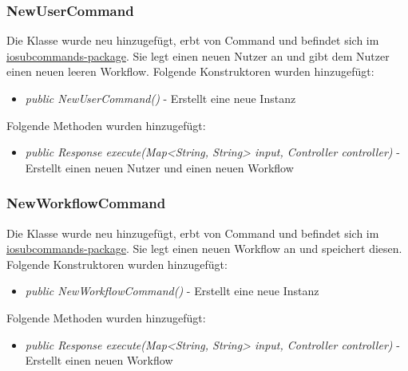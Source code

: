 \documentclass[parskip=full]{scrartcl}
\begin{document}
			\subsubsection{NewUserCommand}
			Die Klasse wurde neu hinzugefügt, erbt von Command und befindet sich im  \hyperlink{controller:controller.commands.iosubcommands}{iosubcommands-package}. Sie legt einen neuen Nutzer an und gibt dem Nutzer einen neuen leeren Workflow.
			Folgende Konstruktoren wurden hinzugefügt:
			\begin{itemize}
				\item \textit{public NewUserCommand()} - Erstellt eine neue Instanz				
			\end{itemize}
			
			Folgende Methoden wurden hinzugefügt:
			\begin{itemize}
				\item \textit{public Response execute(Map<String, String> input, Controller controller)} - Erstellt einen neuen Nutzer und einen neuen Workflow
			\end{itemize}
			
			\subsubsection{NewWorkflowCommand}
			Die Klasse wurde neu hinzugefügt, erbt von Command und befindet sich im  \hyperlink{controller:controller.commands.iosubcommands}{iosubcommands-package}.
			Sie legt einen neuen Workflow an und speichert diesen.
			Folgende Konstruktoren wurden hinzugefügt:
			\begin{itemize}
				\item \textit{public NewWorkflowCommand()} - Erstellt eine neue Instanz				
			\end{itemize}
			
			Folgende Methoden wurden hinzugefügt:
			\begin{itemize}
				\item \textit{public Response execute(Map<String, String> input, Controller controller)} - Erstellt einen neuen Workflow	
			\end{itemize}
	\newpage
	
\end{document}
